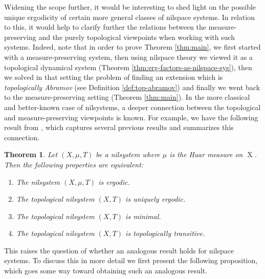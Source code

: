 \documentclass[a4paper,12pt,reqno]{amsart}
\newtheorem{theorem}{Theorem}[section]
\theoremstyle{definition}
\DeclareMathOperator{\ns}{X}
\begin{document}
Widening the scope further, it would be interesting to shed light on the possible unique ergodicity of certain more general classes of nilspace systems. In relation to this, it would help to clarify further the relations between the measure-preserving and the purely topological viewpoints when working with such systems. Indeed, note that in order to prove Theorem \ref{thm:main}, we first started with a measure-preserving system, then using nilspace theory we  viewed it as a topological dynamical system (Theorem \ref{thm:erg-factors-as-nilspace-sys}), then we solved in that setting the problem of finding an extension which is \emph{topologically Abramov} (see Definition \ref{def:top-abramov}) and finally we went back to the measure-preserving setting (Theorem \ref{thm:main}). In the more classical and better-known case of nilsystems, a deeper connection between the topological and measure-preserving viewpoints is known. For example, we have the following result from \cite[Ch.\ 11, Sec.\ 2, Theorem 11]{HKbook}, which captures several previous results and summarizes this connection.
\begin{theorem}\label{thm:nilsmeastop}
Let $(X,\mu,T)$ be a nilsystem where $\mu$ is the Haar measure on $\ns$. Then the following properties are equivalent:
\begin{enumerate}
    \item The nilsystem $(X,\mu,T)$ is ergodic.
    \item The topological nilsystem $(X,T)$ is uniquely ergodic.
    \item The topological nilsystem $(X,T)$ is minimal.
    \item The topological nilsystem $(X,T)$ is topologically transitive.
\end{enumerate}
\end{theorem}
\noindent This raises the question of whether an analogous result holds for nilspace systems. To discuss this in more detail we first present the following proposition, which goes some way toward obtaining such an analogous result.
\end{document}
